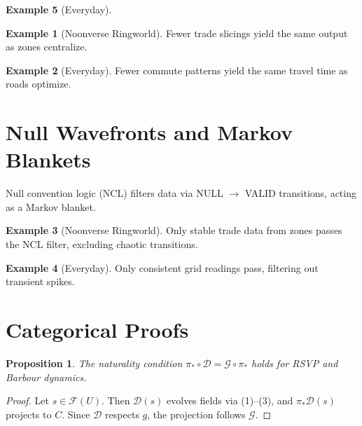 \documentclass[11pt]{article}
\theoremstyle{plain}
\newtheorem{proposition}{Proposition}[section]
\theoremstyle{definition}
\newtheorem{example}{Example}[section]
\begin{document}
\begin{example}[Everyday]
\begin{example}[Noonverse Ringworld]
Fewer trade slicings yield the same output as zones centralize.
\end{example}

\begin{example}[Everyday]
Fewer commute patterns yield the same travel time as roads optimize.
\end{example}

\section{Null Wavefronts and Markov Blankets}
Null convention logic (NCL) filters data via NULL $\to$ VALID transitions, acting as a Markov blanket.

\begin{example}[Noonverse Ringworld]
Only stable trade data from zones passes the NCL filter, excluding chaotic transitions.
\end{example}

\begin{example}[Everyday]
Only consistent grid readings pass, filtering out transient spikes.
\end{example}

\section{Categorical Proofs}
\begin{proposition}
The naturality condition $\pi_* \circ \mathcal{D} = \mathcal{G} \circ \pi_*$ holds for RSVP and Barbour dynamics.
\end{proposition}
\begin{proof}
Let $s \in \mathscr{F}(U)$. Then $\mathcal{D}(s)$ evolves fields via (1)--(3), and $\pi_* \mathcal{D}(s)$ projects to $C$. Since $\mathcal{D}$ respects $g$, the projection follows $\mathcal{G}$.
\end{proof}


\end{example}
\end{document}
